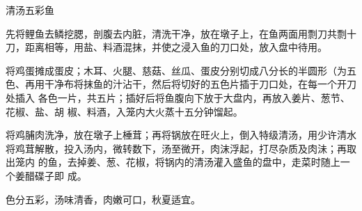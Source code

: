 \begin{recipe}[麒麟鱼]{清汤五彩鱼}

\ingredients


\preparation

\step 先将鲤鱼去鳞挖腮，剖腹去内脏，清洗干净，放在墩子上，在鱼两面用剽刀共剽十
刀，距离相等，用盐、料酒混抹，并使之浸入鱼的刀口处，放入盘中待用。

\step 将鸡蛋摊成蛋皮；木耳、火腿、慈菇、丝瓜、蛋皮分别切成八分长的半圆形（为五
色、再用干净布将抹鱼的汁沾干，然后将切好的五色片插于刀口处，在每一个开刀处插入
各色一片，共五片；插好后将鱼腹向下放于大盘内，再放入姜片、葱节、花椒、盐、胡
椒、料酒，入笼内大火蒸十五分钟馏起。

\step 将鸡脯肉洗净，放在墩子上棰茸；再将锅放在旺火上，倒入特级清汤，用少许清水
将鸡茸解散，投入汤内，微转数下，汤至微开，肉沫浮起，打尽杂质及肉沬；再取出笼内
的鱼，去掉姜、葱、花椒，将锅内的清汤灌入盛鱼的盘中，走菜时随上一个姜醋碟子即
成。

\features

色分五彩，汤味清香，肉嫩可口，秋夏适宜。

\end{recipe}

